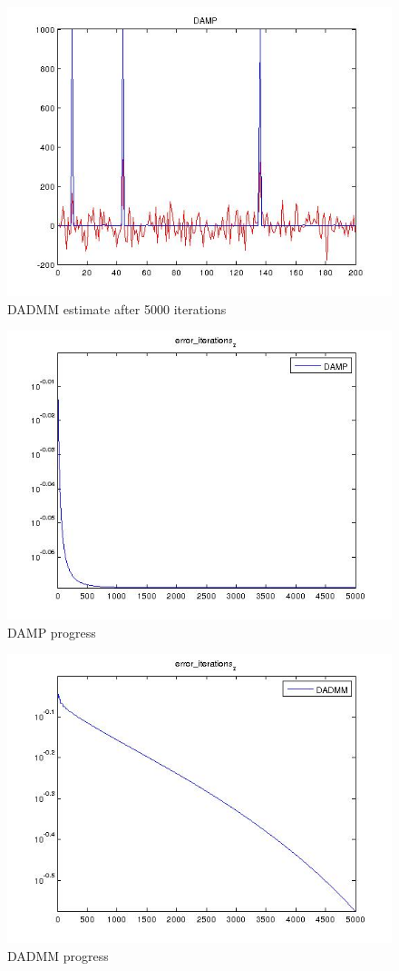 \documentclass{article}
\begin{document}
\begin{figure}[h]
\centering
\includegraphics[height = 7.3 cm]{DADMMxhat5000.jpg}
\caption{DADMM estimate after 5000 iterations}
\label{fig:hvb}
\end{figure}

\begin{figure}[h]
\centering
\includegraphics[height = 7.3 cm]{DAMP5000its.jpg}
\caption{DAMP progress}
\label{fig:hvb}
\end{figure}

\begin{figure}[h]
\centering
\includegraphics[height = 7.3 cm]{DADMM5000its.jpg}
\caption{DADMM progress}
\label{fig:hvb}
\end{figure}
\end{document}
